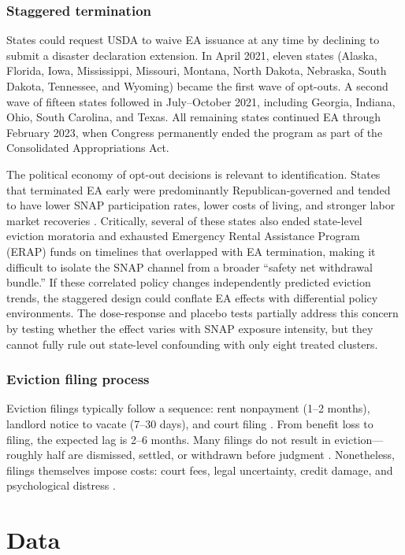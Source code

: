 \documentclass[12pt]{article}
\begin{document}
\subsubsection*{Staggered termination}  States could request USDA to waive EA issuance at any time by declining to submit a disaster declaration extension. In April 2021, eleven states (Alaska, Florida, Iowa, Mississippi, Missouri, Montana, North Dakota, Nebraska, South Dakota, Tennessee, and Wyoming) became the first wave of opt-outs. A second wave of fifteen states followed in July--October 2021, including Georgia, Indiana, Ohio, South Carolina, and Texas. All remaining states continued EA through February 2023, when Congress permanently ended the program as part of the Consolidated Appropriations Act.

The political economy of opt-out decisions is relevant to identification. States that terminated EA early were predominantly Republican-governed and tended to have lower SNAP participation rates, lower costs of living, and stronger labor market recoveries \citep{CBPP2022EA}. Critically, several of these states also ended state-level eviction moratoria and exhausted Emergency Rental Assistance Program (ERAP) funds on timelines that overlapped with EA termination, making it difficult to isolate the SNAP channel from a broader ``safety net withdrawal bundle.'' If these correlated policy changes independently predicted eviction trends, the staggered design could conflate EA effects with differential policy environments. The dose-response and placebo tests partially address this concern by testing whether the effect varies with SNAP exposure intensity, but they cannot fully rule out state-level confounding with only eight treated clusters.

\subsubsection*{Eviction filing process}  Eviction filings typically follow a sequence: rent nonpayment (1--2 months), landlord notice to vacate (7--30 days), and court filing \citep{Gromis2022EvictionTimeline}. From benefit loss to filing, the expected lag is 2--6 months. Many filings do not result in eviction---roughly half are dismissed, settled, or withdrawn before judgment \citep{EvictionLab2024}. Nonetheless, filings themselves impose costs: court fees, legal uncertainty, credit damage, and psychological distress \citep{Desmond2016Evicted}.

\section{Data}
\end{document}
